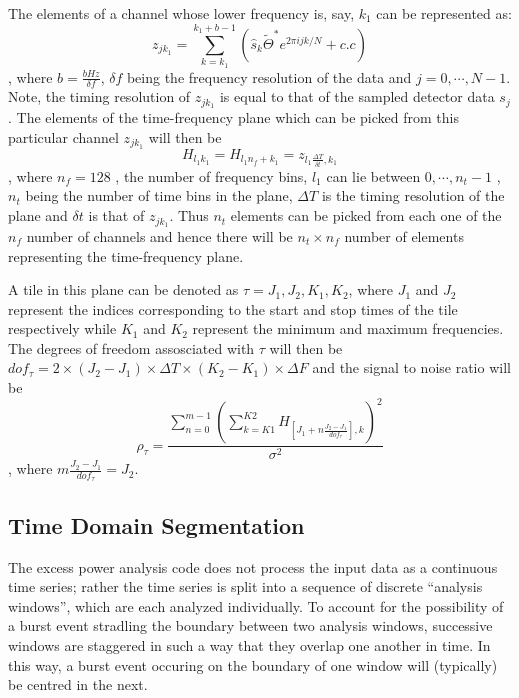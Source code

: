 The elements of a channel whose lower frequency is,  say,  $k_1$ can 
be represented as:
\begin{equation}
z_{jk_1} = \sum_{k=k_1}^{k_1+b-1} ( \hat{s}_k \tilde{\Theta}^\ast e^{2 \pi ijk/N}
                                  + c.c )
\end{equation},  where $b = \frac{b Hz}{\delta f}$, $\delta f$ being the 
frequency resolution of the data and $j = 0,\cdots, N-1$.  Note,  the timing
resolution of $z_{jk_1}$ is equal to that of the sampled detector data $s_j$.
 The elements of the time-frequency plane which can be picked from this 
particular channel $z_{jk_1}$ will then be 
\begin{equation}
H_{l_1k_1} = H_{l_1n_f + k_1} = z_{l_1\frac{\Delta T}{\delta t} , k_1}
\end{equation}, where $n_f = 128$ , the number of frequency bins, 
$l_1$ can lie between $0, \cdots, n_t - 1$ , $n_t$ being the number of 
time bins in the plane,  $\Delta T$ is the timing resolution of the
plane and $\delta t$ is that of $z_{jk_1}$.  Thus $n_t$ elements can be
 picked from each one of the $n_f$ number of channels and hence there will be 
$n_t \times n_f$ number of elements representing the time-frequency plane.

A tile in this plane can be denoted as $\tau ={J_1, J_2, K_1, K_2}$,  where
$J_1$ and $J_2$ represent the indices corresponding to the start and 
stop times of the tile respectively while $K_1$ and $K_2$ represent the
minimum and maximum frequencies.  The degrees of freedom assosciated with
$\tau$ will then be $dof_{\tau} = 2 \times (J_2 - J_1) \times \Delta T \times (K_2 - K_1) \times \Delta F $ and the signal to noise ratio will be 
\begin{equation}
\rho_{\tau} = \frac{\sum_{n=0}^{m-1}(\sum_{k=K1}^{K2}H_{[J_1 + n\frac{J_2-J_1}{dof_{\tau}}],k})^2}{\sigma ^2}
\end{equation}
,  where $m\frac{J_2-J_1}{dof_\tau} = J_2$.



\subsection{Time Domain Segmentation}
The excess power analysis code does not process the input data as a
continuous time series;  rather the time series is split into a sequence of
discrete ``analysis windows'', which are each analyzed individually.  To
account for the possibility of a burst event stradling the boundary between
two analysis windows, successive windows are staggered in such a way that
they overlap one another in time.  In this way, a burst event occuring on
the boundary of one window will (typically) be centred in the next.

